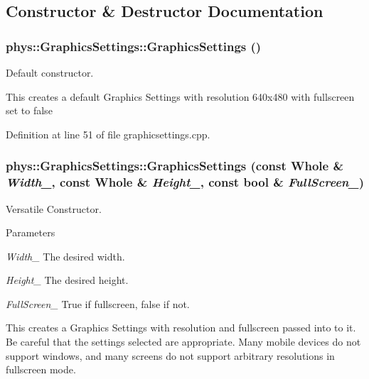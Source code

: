 \subsection{Constructor \& Destructor Documentation}
\hypertarget{classphys_1_1GraphicsSettings_aceaaf53585413067adbf271e2c1e48fa}{
\subsubsection[{GraphicsSettings}]{\setlength{\rightskip}{0pt plus 5cm}phys::GraphicsSettings::GraphicsSettings ()}}
\label{dc/df1/classphys_1_1GraphicsSettings_aceaaf53585413067adbf271e2c1e48fa}


Default constructor. 

This creates a default Graphics Settings with resolution 640x480 with fullscreen set to false 

Definition at line 51 of file graphicsettings.cpp.

\hypertarget{classphys_1_1GraphicsSettings_a7cbb84f41101ef66a04e2a0990f796a2}{
\subsubsection[{GraphicsSettings}]{\setlength{\rightskip}{0pt plus 5cm}phys::GraphicsSettings::GraphicsSettings (const Whole \& {\em Width\_\-}, \/  const Whole \& {\em Height\_\-}, \/  const bool \& {\em FullScreen\_\-})}}
\label{dc/df1/classphys_1_1GraphicsSettings_a7cbb84f41101ef66a04e2a0990f796a2}


Versatile Constructor. 


\begin{DoxyParams}{Parameters}
\item[{\em Width\_\-}]The desired width. \item[{\em Height\_\-}]The desired height. \item[{\em FullScreen\_\-}]True if fullscreen, false if not.\end{DoxyParams}
This creates a Graphics Settings with resolution and fullscreen passed into to it. Be careful that the settings selected are appropriate. Many mobile devices do not support windows, and many screens do not support arbitrary resolutions in fullscreen mode. 

